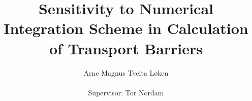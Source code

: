 \title{\Huge Sensitivity to Numerical Integration Scheme in Calculation of
Transport Barriers}

\author[ ]{{\Large Arne Magnus Tveita Løken\\~\\}
Supervisor: Tor Nordam}


\renewcommand\Affilfont{\itshape\small}

\maketitle
